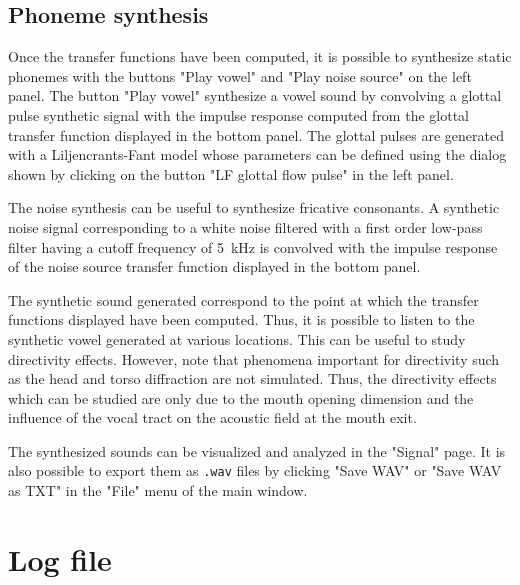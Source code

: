 \documentclass[]{article}
\begin{document}
	\subsection{Phoneme synthesis}
	
	Once the transfer functions have been computed, it is possible to synthesize 
	static phonemes with the buttons "Play vowel" and "Play noise source" on the left panel.
	The button "Play vowel" synthesize a vowel sound by convolving a glottal pulse
	synthetic signal with the impulse response computed from the glottal transfer function
	displayed in the bottom panel. 
	The glottal pulses are generated with a Liljencrants-Fant model \cite{fant1985four}
	whose parameters can be defined using the dialog shown by clicking on the button 
	"LF glottal flow pulse" in the left panel.
	
	The noise synthesis can be useful to synthesize fricative consonants.
	A synthetic noise signal corresponding to a white noise filtered with a first order 
	low-pass filter having a cutoff frequency of 5~kHz is convolved with the 
	impulse response of the noise source transfer function displayed in the bottom panel.
	
	The synthetic sound generated correspond to the point at which the transfer functions
	displayed have been computed.
	Thus, it is possible to listen to the synthetic vowel generated at various locations.
	This can be useful to study directivity effects.
	However, note that phenomena important for directivity such as the head and torso
	diffraction are not simulated. Thus, the directivity effects which can be studied 
	are only due to the mouth opening dimension and the influence of the vocal tract
	on the acoustic field at the mouth exit.
	
	The synthesized sounds can be visualized and analyzed in the "Signal" page. 
	It is also possible to export them as \texttt{.wav} files by clicking "Save WAV" or
	"Save WAV as TXT" in the "File" menu of the main window.
	
	\section{Log file}
	
\end{document}
